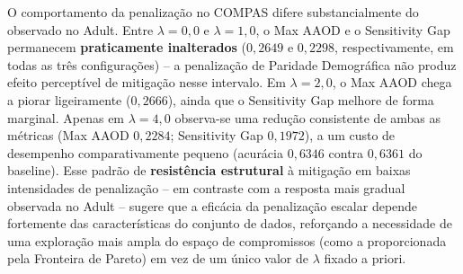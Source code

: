 \begin{table}[H]
    \centering
    \caption{COMPAS: Efeito da penalização de viés na FairMLP (lambda sweep).}
    \vspace{2mm}
    \label{tab:compas_lambda_sweep}
\end{table}

O comportamento da penalização no COMPAS difere substancialmente do observado no Adult. Entre $\lambda = 0,0$ e $\lambda = 1,0$, o Max AAOD e o Sensitivity Gap permanecem \textbf{praticamente inalterados} ($0,2649$ e $0,2298$, respectivamente, em todas as três configurações) -- a penalização de Paridade Demográfica não produz efeito perceptível de mitigação nesse intervalo. Em $\lambda = 2,0$, o Max AAOD chega a piorar ligeiramente ($0,2666$), ainda que o Sensitivity Gap melhore de forma marginal. Apenas em $\lambda = 4,0$ observa-se uma redução consistente de ambas as métricas (Max AAOD $0,2284$; Sensitivity Gap $0,1972$), a um custo de desempenho comparativamente pequeno (acurácia $0,6346$ contra $0,6361$ do baseline). Esse padrão de \textbf{resistência estrutural} à mitigação em baixas intensidades de penalização -- em contraste com a resposta mais gradual observada no Adult -- sugere que a eficácia da penalização escalar depende fortemente das características do conjunto de dados, reforçando a necessidade de uma exploração mais ampla do espaço de compromissos (como a proporcionada pela Fronteira de Pareto) em vez de um único valor de $\lambda$ fixado a priori.

